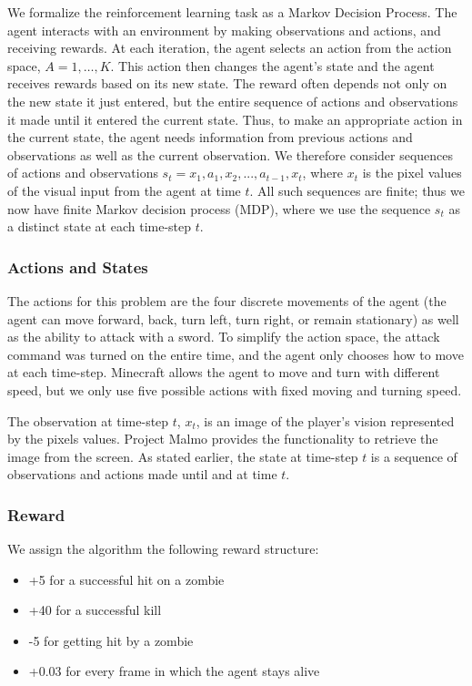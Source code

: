 \documentclass{article}
\begin{document}
\begin{multicols}{2}
We formalize the reinforcement learning task as a Markov Decision Process.
The agent interacts with an environment by making observations and actions, and receiving rewards.
At each iteration, the agent selects an action from the action space, $A = {1, \dots , K}$.
This action then changes the agent's state and the agent receives rewards based on its new state.
The reward often depends not only on the new state it just entered, but the entire sequence of actions and observations it made until it entered the current state.
Thus, to make an appropriate action in the current state, the agent needs information from previous actions and observations as well as the current observation.
We therefore consider sequences of actions and observations $s_t = x_1, a_1, x_2, ..., a_{t-1}, x_t$, where $x_t$ is the pixel values of the visual input from the agent at time $t$.
All such sequences are finite; thus we now have finite Markov decision process (MDP), where we use the sequence $s_t$ as a distinct state at each time-step $t$.

\subsubsection{Actions and States}

The actions for this problem are the four discrete movements of the agent (the agent can move forward, back, turn left, turn right, or remain stationary) as well as the ability to attack with a sword. To simplify the action space, the attack command was turned on the entire time, and the agent only chooses how to move at each time-step. Minecraft allows the agent to move and turn with different speed, but we only use five possible actions with fixed moving and turning speed.

The observation at time-step $t$, $x_t$, is an image of the player's vision represented by the pixels values.
Project Malmo provides the functionality to retrieve the image from the screen.
As stated earlier, the state at time-step $t$ is a sequence of observations and actions made until and at time $t$.


\subsubsection{Reward}

We assign the algorithm the following reward structure:
\begin{itemize}
    \item +5 for a successful hit on a zombie
    \item +40 for a successful kill
    \item -5 for getting hit by a zombie
    \item +0.03 for every frame in which the agent stays alive
\end{itemize}


\end{multicols}
\end{document}
